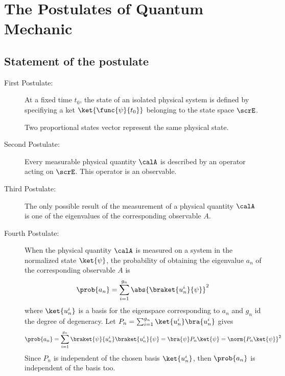 \chapter{The Postulates of Quantum Mechanic}
\section{Statement of the postulate}
\begin{description}
    \item[First Postulate:] At a fixed time \(t_0\), the state of an isolated physical system is defined by specifiying a ket \(\ket{\func{\psi}{t_0}}\) belonging to the state space \(\scrE\).
        \begin{remark}
            Two proportional states vector represent the same physical state.
        \end{remark}

    \item[Second Postulate:] Every measurable physical quantity \(\calA\) is described by an operator acting on \(\scrE\). This operator is an observable.
    \item[Third Postulate:] The only possible result of the measurement of a physical quantity \(\calA\) is one of the eigenvalues of the corresponding observable \(A\).
    \item[Fourth Postulate:] When the physical quantity \(\calA\) is measured on a system in the normalized state \(\ket{\psi}\), the probability of obtaining the eigenvalue \(a_n\) of the corresponding observable \(A\) is
        \begin{equation*}
            \prob{a_n} = \sum_{i = 1}^{g_n} \abs{\braket{u^i_n}{\psi}}^2
        \end{equation*}
        where \(\ket{u^i_n}\) is a basis for the eigenspace corresponding to \(a_n\) and \(g_n\) id the degree of degeneracy. Let \(P_n = \sum_{i = 1}^{g_n} \ket{u_n^i} \bra{u_n^i}\) gives
        \begin{equation*}
            \prob{a_n} = \sum_{i = 1}^{g_n} \braket{\psi}{u^i_n} \braket{u_n^i}{\psi} = \bra{\psi}P_n \ket{\psi} = \norm{P_n \ket{\psi}}^2
        \end{equation*}
        Since \(P_n\) is independent of the chosen basis \(\ket{u^i_n}\), then \(\prob{a_n}\) is independent of the basis too.


\end{description}
